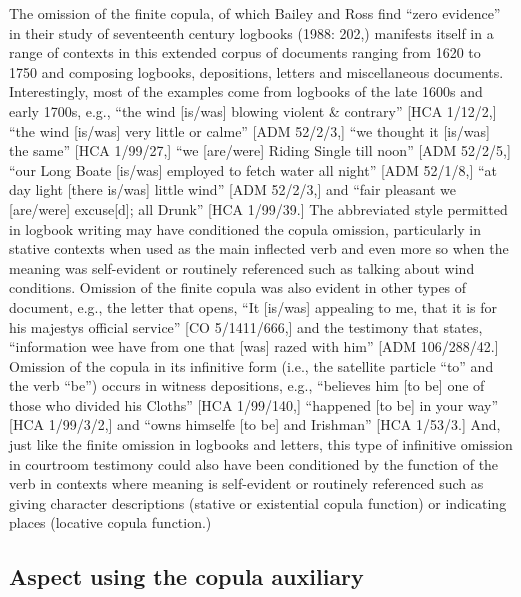 The omission of the finite copula, of which Bailey and Ross find “zero evidence” in their study of seventeenth century logbooks (1988: 202,) manifests itself in a range of contexts in this extended corpus of documents ranging from 1620 to 1750 and composing logbooks, depositions, letters and miscellaneous documents. Interestingly, most of the examples come from logbooks of the late 1600s and early 1700s, e.g., “the wind [is/was] blowing violent \& contrary” [HCA 1/12/2,] “the wind [is/was] very little or calme” [ADM 52/2/3,] “we thought it [is/was] the same” [HCA 1/99/27,] “we [are/were] Riding Single till noon” [ADM 52/2/5,] “our Long Boate [is/was] employed to fetch water all night” [ADM 52/1/8,] “at day light [there is/was] little wind” [ADM 52/2/3,] and “fair pleasant we [are/were] excuse[d]; all Drunk” [HCA 1/99/39.] The abbreviated style permitted in logbook writing may have conditioned the copula omission, particularly in stative contexts when used as the main inflected verb and even more so when the meaning was self-evident or routinely referenced such as talking about wind conditions.  Omission of the finite copula was also evident in other types of document, e.g., the letter that opens, “It [is/was] appealing to me, that it is for his majestys official service” [CO 5/1411/666,] and the testimony that states, “information wee have from one that [was] razed with him” [ADM 106/288/42.] Omission of the copula in its infinitive form (i.e., the satellite particle “to” and the verb “be”) occurs in witness depositions, e.g., “believes him [to be] one of those who divided his Cloths” [HCA 1/99/140,] “happened [to be] in your way” [HCA 1/99/3/2,] and “owns himselfe [to be] and Irishman” [HCA 1/53/3.] And, just like the finite omission in logbooks and letters, this type of infinitive omission in courtroom testimony could also have been conditioned by the function of the verb in contexts where meaning is self-evident or routinely referenced such as giving character descriptions (stative or existential copula function) or indicating places (locative copula function.)

\subsection{{Aspect} {using} {the} {copula} {auxiliary}}%

